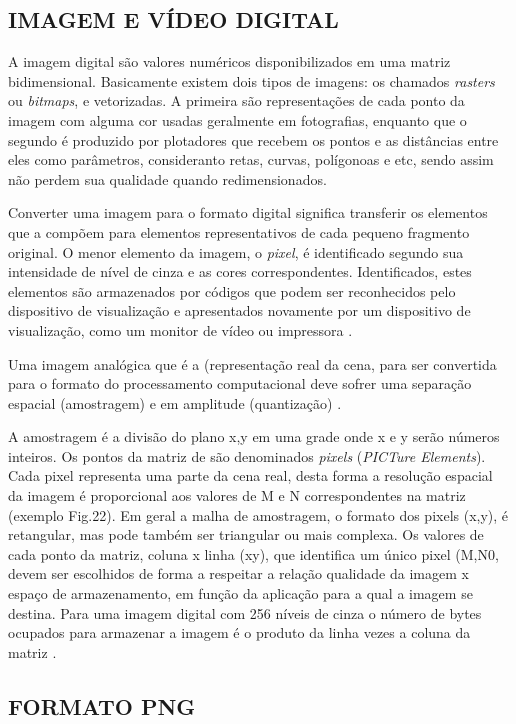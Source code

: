 \subsection{IMAGEM E VÍDEO DIGITAL}\label{subsec:imagem}

A imagem digital são valores numéricos disponibilizados em uma matriz bidimensional. Basicamente existem dois tipos de imagens: os chamados \textit{rasters} ou \textit{bitmaps}, e vetorizadas. A primeira são representações de cada ponto da imagem com alguma cor usadas geralmente em fotografias, enquanto que o segundo é produzido por plotadores que recebem os pontos e as distâncias entre eles como parâmetros, consideranto retas, curvas, polígonoas e etc, sendo assim não perdem sua qualidade quando redimensionados.

Converter uma imagem para o formato digital significa transferir os elementos que a compõem para elementos representativos de cada pequeno fragmento original. O menor elemento da imagem, o \textit{pixel}, é identificado segundo sua intensidade de nível de cinza e as cores correspondentes. Identificados, estes elementos são armazenados por códigos que podem ser reconhecidos pelo dispositivo de visualização e apresentados novamente por um dispositivo de visualização, como um monitor de vídeo ou impressora \cite{img-digital-willians}. 

Uma imagem analógica que é a (representação real da cena, para ser convertida para o formato do
processamento computacional deve sofrer uma separação espacial (amostragem) e em amplitude
(quantização) \cite{img-digital-willians}. 

A amostragem é a divisão do plano x,y em uma grade onde x e y serão números inteiros. Os pontos da
matriz de são denominados \textit{pixels} (\textit{PICTure Elements}). Cada pixel representa uma parte da cena real, desta forma a resolução espacial da imagem é proporcional aos valores de M e N correspondentes na matriz (exemplo Fig.22). Em geral a malha de amostragem, o formato dos pixels (x,y), é retangular, mas pode também ser triangular ou mais complexa. Os valores de cada ponto da matriz, coluna x linha (xy), que identifica um único pixel (M,N0, devem ser escolhidos de forma a respeitar a relação qualidade da imagem x espaço de armazenamento, em função da aplicação para a qual a imagem se destina. Para uma imagem digital com 256 níveis de cinza o número de bytes ocupados para armazenar a imagem é o produto da linha vezes a coluna da matriz \cite{img-digital-willians}. 


\subsection{FORMATO PNG}\label{subsec:png}

